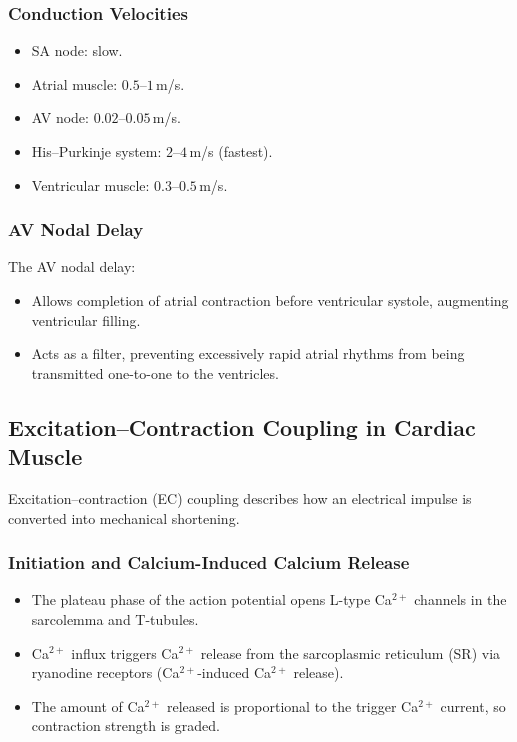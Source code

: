 \documentclass[11pt,a4paper]{article}
\begin{document}
\subsubsection{Conduction Velocities}

\begin{itemize}
  \item SA node: slow.
  \item Atrial muscle: $0.5$--$1$\,m/s.
  \item AV node: $0.02$--$0.05$\,m/s.
  \item His--Purkinje system: $2$--$4$\,m/s (fastest).
  \item Ventricular muscle: $0.3$--$0.5$\,m/s.
\end{itemize}

\subsubsection{AV Nodal Delay}

The AV nodal delay:
\begin{itemize}
  \item Allows completion of atrial contraction before ventricular systole, augmenting ventricular filling.
  \item Acts as a filter, preventing excessively rapid atrial rhythms from being transmitted one-to-one to the ventricles.
\end{itemize}

\subsection{Excitation--Contraction Coupling in Cardiac Muscle}

Excitation--contraction (EC) coupling describes how an electrical impulse is converted into mechanical shortening.

\subsubsection{Initiation and Calcium-Induced Calcium Release}

\begin{itemize}
  \item The plateau phase of the action potential opens L-type Ca$^{2+}$ channels in the sarcolemma and T-tubules.
  \item Ca$^{2+}$ influx triggers Ca$^{2+}$ release from the sarcoplasmic reticulum (SR) via ryanodine receptors (Ca$^{2+}$-induced Ca$^{2+}$ release).
  \item The amount of Ca$^{2+}$ released is proportional to the trigger Ca$^{2+}$ current, so contraction strength is graded.
\end{itemize}
\end{document}
